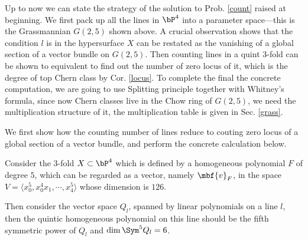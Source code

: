 \documentclass[a4paper, twoside]{article}
\begin{document}


Up to now we can state the strategy of the solution to Prob. \ref{count} raised at beginning. We first pack up all the lines in $\bP^4$ into a parameter space---this is the Grassmannian $G(2,5)$ shown above. A crucial observation shows that the condition $l$ is in the hypersurface $X$ can be restated as the vanishing of a global section of a vector bundle on $G(2,5)$. Then counting lines in a quint $3$-fold can be shown to equivalent to find out the number of zero locus of it, which is the degree of top Chern class by Cor. \ref{locus}. To complete the final the concrete computation, we are going to use Splitting principle together with Whitney's formula, since now Chern classes live in the Chow ring of $G(2,5)$, we need the multiplication structure of it, the multiplication table is given in Sec. \ref{grass}.

We first show how the counting number of lines reduce to couting zero locus of a global section of a vector bundle, and perform the concrete calculation below.

Consider the 3-fold $X\subset\bP^4$ which is defined by a homogeneous polynomial $F$ of degree $5$, which can be regarded as a vector, namely $\mbf{v}_F$, in the space $V=\langle x_0^5, x_0^4x_1,\cdots, x_4^5\rangle$ whose dimension is $126$.

Then consider the vector space $Q_l$, spanned by linear polynomials on a line $l$, then the quintic homogeneous polynomial on this line should be the fifth symmetric power of $Q_l$ and $\dim\Sym^5Q_l=6$.
\end{document}
